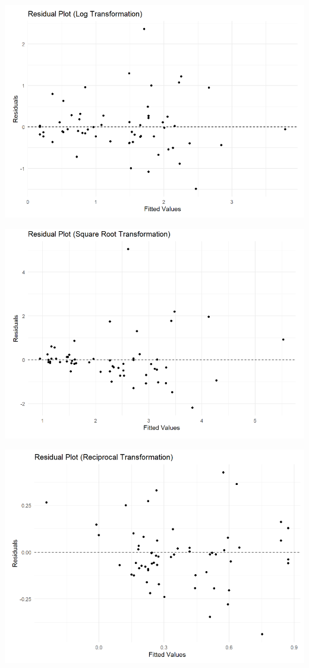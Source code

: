 \documentclass{article}
\begin{document}
\begin{center}
\includegraphics[scale=0.5]{graphs/graph-log.png}
\end{center}

\begin{center}
\includegraphics[scale=0.5]{graphs/graph-sqrt.png}
\end{center}

\begin{center}
\includegraphics[scale=0.5]{graphs/graph-over.png}
\end{center}
\end{document}
